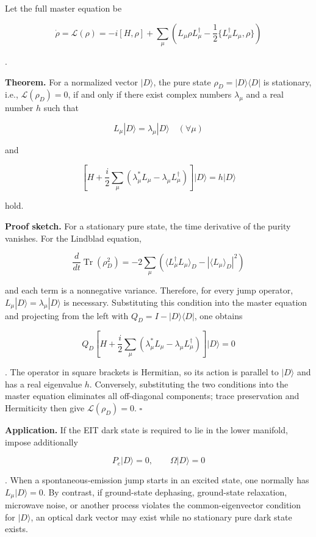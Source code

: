\documentclass[
  10pt,
  a4paper,
]{article}
\begin{document}
Let the full master equation be

\[
\dot\rho=\mathcal L(\rho)
=-i[H,\rho]
+\sum_\mu\left(
L_\mu\rho L_\mu^\dagger
-\frac12\{L_\mu^\dagger L_\mu,\rho\}
\right)
\]

.

\textbf{Theorem.} For a normalized vector \(|D\rangle\), the pure state
\(\rho_D=|D\rangle\langle D|\) is stationary, i.e.,
\(\mathcal L(\rho_D)=0\), if and only if there exist complex numbers
\(\lambda_\mu\) and a real number \(h\) such that

\[
\boxed{
L_\mu|D\rangle=\lambda_\mu|D\rangle
\quad(\forall\mu)
}
\]

and

\[
\boxed{
\left[
H+\frac{i}{2}\sum_\mu
\left(\lambda_\mu^*L_\mu-
\lambda_\mu L_\mu^\dagger\right)
\right]|D\rangle
=h|D\rangle
}
\]

hold.

\textbf{Proof sketch.} For a stationary pure state, the time derivative
of the purity vanishes. For the Lindblad equation,

\[
\frac{d}{dt}\operatorname{Tr}(\rho_D^2)
=-2\sum_\mu
\left(
\langle L_\mu^\dagger L_\mu\rangle_D
-|\langle L_\mu\rangle_D|^2
\right)
\]

and each term is a nonnegative variance. Therefore, for every jump
operator, \(L_\mu|D\rangle=\lambda_\mu|D\rangle\) is necessary.
Substituting this condition into the master equation and projecting from
the left with \(Q_D=I-|D\rangle\langle D|\), one obtains

\[
Q_D\left[
H+\frac{i}{2}\sum_\mu
(\lambda_\mu^*L_\mu-
\lambda_\mu L_\mu^\dagger)
\right]|D\rangle=0
\]

. The operator in square brackets is Hermitian, so its action is
parallel to \(|D\rangle\) and has a real eigenvalue \(h\). Conversely,
substituting the two conditions into the master equation eliminates all
off-diagonal components; trace preservation and Hermiticity then give
\(\mathcal L(\rho_D)=0\). \(\square\)

\textbf{Application.} If the EIT dark state is required to lie in the
lower manifold, impose additionally

\[
P_e|D\rangle=0,
\qquad
\Omega|D\rangle=0
\]

. When a spontaneous-emission jump starts in an excited state, one
normally has \(L_\mu|D\rangle=0\). By contrast, if ground-state
dephasing, ground-state relaxation, microwave noise, or another process
violates the common-eigenvector condition for \(|D\rangle\), an optical
dark vector may exist while no stationary pure dark state exists.
\end{document}
